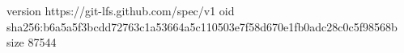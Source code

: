 version https://git-lfs.github.com/spec/v1
oid sha256:b6a5a5f3bcdd72763c1a53664a5c110503e7f58d670e1fb0adc28c0c5f98568b
size 87544
